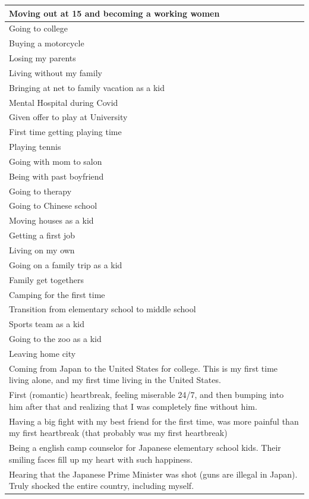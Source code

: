 \documentclass[
  .7em,
  letterpaper,
  DIV=11,
  numbers=noendperiod]{scrartcl}
\begin{document}
\begin{table}
\begin{tabular}{l}
\hline
Moving out at 15 and becoming a working women\\
\hline
Going to college\\
\hline
Buying a motorcycle\\
\hline
Losing my parents\\
\hline
Living without my family\\
\hline
Bringing at net to family vacation as a kid\\
\hline
Mental Hospital during Covid\\
\hline
Given offer to play at University\\
\hline
First time getting playing time\\
\hline
Playing tennis\\
\hline
Going with mom to salon\\
\hline
Being with past boyfriend\\
\hline
Going to therapy\\
\hline
Going to Chinese school\\
\hline
Moving houses as a kid\\
\hline
Getting a first job\\
\hline
Living on my own\\
\hline
Going on a family trip as a kid\\
\hline
Family get togethers\\
\hline
Camping for the first time\\
\hline
Transition from elementary school to middle school\\
\hline
Sports team as a kid\\
\hline
Going to the zoo as a kid\\
\hline
Leaving home city\\
\hline
Coming from Japan to the United States for college. This is my first time living alone, and my first time living in the United States.\\
\hline
First (romantic) heartbreak, feeling miserable 24/7, and then bumping into him after that and realizing that I was completely fine without him.\\
\hline
Having a big fight with my best friend for the first time, was more painful than my first heartbreak (that probably was my first heartbreak)\\
\hline
Being a english camp counselor for Japanese elementary school kids. Their smiling faces fill up my heart with such happiness.\\
\hline
Hearing that the Japanese Prime Minister was shot (guns are illegal in Japan). Truly shocked the entire country, including myself.\\

\end{tabular}
\end{table}
\end{document}
